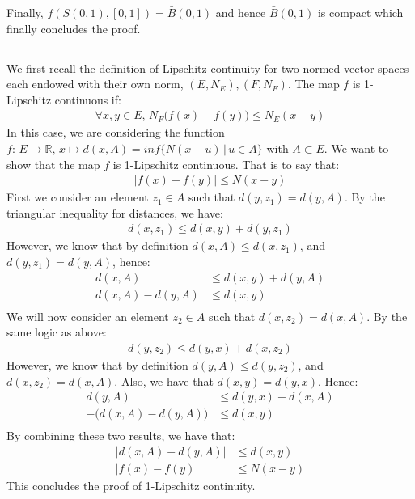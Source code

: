 \documentclass{article}
\begin{document}
\noindent Finally, $f(S(0,1), [0,1]) = \bar{B}(0,1)$ and hence $\bar{B}(0,1)$ is compact which finally concludes the proof. 


\subsection{} %

We first recall the definition of Lipschitz continuity for two normed vector spaces each endowed with their own norm, $(E,N_E), (F,N_F)$. The map $f$ is 1-Lipschitz continuous if:
\begin{align*}
	\forall x,y \in E, \, N_F\big( f(x) - f(y) \big) \leq N_E(x-y)
\end{align*}
In this case, we are considering the function $f:\, E \rightarrow \mathbb{R}, \, x \mapsto d(x,A) = inf\{ N(x-u) \, | \, u \in A \}$  with $A \subset E$. We want to show that the map $f$ is 1-Lipschitz continuous. That is to say that:
\begin{align*}
	\big| f(x) - f(y) \big| \leq N(x-y)
\end{align*}
First we consider an element $z_1 \in \bar{A}$ such that $d(y,z_1) = d(y,A)$. By the triangular inequality for distances, we have:
\begin{align*}
	d(x,z_1) \leq d(x,y) + d(y,z_1)
\end{align*}
However, we know that by definition $d(x,A) \leq d(x,z_1)$, and $d(y,z_1) = d(y,A)$, hence:
\begin{align*}
	d(x,A) &\leq d(x,y) + d(y,A)\\
	d(x,A) - d(y,A) &\leq d(x,y) \\
\end{align*}
We will now consider an element $z_2 \in \bar{A}$ such that $d(x,z_2) = d(x,A)$. By the same logic as above:
\begin{align*}
	d(y,z_2) \leq d(y,x) + d(x,z_2)
\end{align*}
However, we know that by definition $d(y,A) \leq d(y,z_2)$, and $d(x,z_2) = d(x,A)$. Also, we have that $d(x,y) = d(y,x)$. Hence:
\begin{align*}
	d(y,A) &\leq d(y,x) + d(x,A)\\
	-\big( d(x,A) - d(y,A) \big) &\leq d(x,y) \\
\end{align*}
By combining these two results, we have that:
\begin{align*}
	\big| d(x,A) - d(y,A) \big| &\leq d(x,y)\\
	\big| f(x) - f(y) \big| &\leq N(x-y)
\end{align*}
This concludes the proof of 1-Lipschitz continuity.
\end{document}
